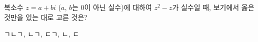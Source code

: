 복소수 $z=a+bi$ ($a$, $b$는 $0$이 아닌 실수)에 대하여 $z^2-z$가 실수일 때, 보기에서 옳은 것만을 있는 대로 고른 것은? 
\begin{choices32}{ㄱ}{ㄴ}{ㄱ, ㄴ}{ㄱ, ㄷ}{ㄱ, ㄴ, ㄷ}\end{choices32}
